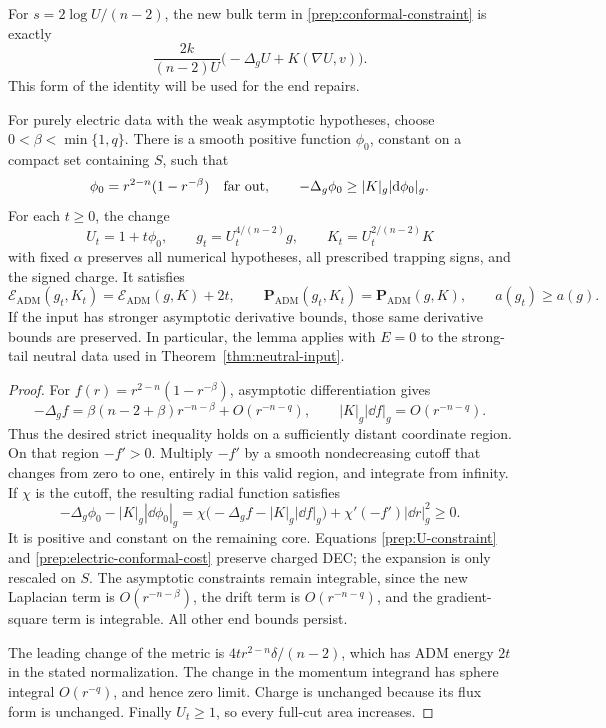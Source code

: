 For $s=2\log U/(n-2)$, the new bulk term in
\eqref{prep:conformal-constraint} is exactly
\begin{equation}
 \label{prep:U-constraint}
 \frac{2k}{(n-2)U}
 \bigl(-\Delta_gU+K(\nabla U,v)\bigr).
\end{equation}
This form of the identity will be used for the end repairs.

\begin{lemma}
\label{prep:end-increase}
For purely electric data with the weak asymptotic hypotheses, choose
$0<\beta<\min\{1,q\}$.  There is a smooth positive function $\phi_0$,
constant on a compact set containing $S$, such that
\[
 \phi_0=r^{2-n}(1-r^{-\beta})\quad\hbox{far out},
 \qquad -\Delta_g\phi_0\geq|K|_g|\mathrm d\phi_0|_g.
\]
For each $t\geq0$, the change
\[
 U_t=1+t\phi_0,\qquad
 g_t=U_t^{4/(n-2)}g,\qquad K_t=U_t^{2/(n-2)}K
\]
with fixed $\alpha$ preserves all numerical hypotheses, all prescribed
trapping signs, and the signed charge.  It satisfies
\begin{equation}
 \label{prep:end-increase-charges}
 \mathcal E_{\mathrm{ADM}}(g_t,K_t)
 =\mathcal E_{\mathrm{ADM}}(g,K)+2t,
 \qquad \mathbf P_{\mathrm{ADM}}(g_t,K_t)
 =\mathbf P_{\mathrm{ADM}}(g,K),
 \qquad a(g_t)\geq a(g).
\end{equation}
If the input has stronger asymptotic derivative bounds, those same
derivative bounds are preserved.  In particular, the lemma applies
with $E=0$ to the strong-tail neutral data used in
Theorem~\ref{thm:neutral-input}.
\end{lemma}

\begin{proof}
For $f(r)=r^{2-n}(1-r^{-\beta})$, asymptotic differentiation gives
\[
 -\Delta_g f
 =\beta(n-2+\beta)r^{-n-\beta}+O(r^{-n-q}),
 \qquad |K|_g|\dd f|_g=O(r^{-n-q}).
\]
Thus the desired strict inequality holds on a sufficiently distant
coordinate region.  On that region $-f'>0$.  Multiply $-f'$ by a smooth
nondecreasing cutoff that changes from zero to one, entirely in this
valid region, and integrate from infinity.  If $\chi$ is the cutoff,
the resulting radial function satisfies
\[
 -\Delta_g\phi_0-|K|_g|\dd\phi_0|_g
 =\chi\bigl(-\Delta_g f-|K|_g|\dd f|_g\bigr)
   +\chi'(-f')|\dd r|_g^2\geq0.
\]
It is positive and constant on the remaining core.  Equations
\eqref{prep:U-constraint} and \eqref{prep:electric-conformal-cost}
preserve charged DEC; the expansion is only rescaled on $S$.
The asymptotic constraints remain integrable, since the new Laplacian
term is $O(r^{-n-\beta})$, the drift term is $O(r^{-n-q})$, and the
gradient-square term is integrable.  All other end bounds persist.

The leading change of the metric is
$4t r^{2-n}\delta/(n-2)$, which has ADM energy $2t$ in the stated
normalization.  The change in the momentum integrand has sphere integral
$O(r^{-q})$, and hence zero limit.  Charge is unchanged because its
flux form is unchanged.  Finally $U_t\geq1$, so every full-cut area
increases.
\end{proof}


